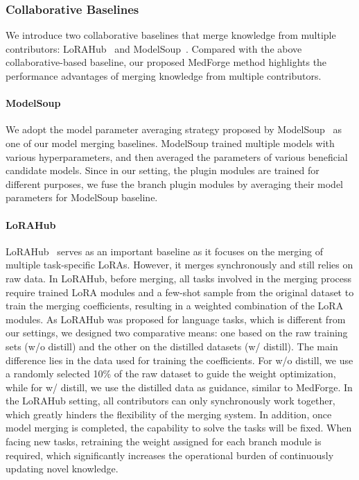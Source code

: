 \subsubsection{Collaborative Baselines}
We introduce two collaborative baselines that merge knowledge from multiple contributors: LoRAHub~\cite{huang2023lorahub} and ModelSoup~\cite{wortsman2022model}. Compared with the above collaborative-based baseline, our proposed MedForge method highlights the performance advantages of merging knowledge from multiple contributors.

\paragraph{ModelSoup}
We adopt the model parameter averaging strategy proposed by ModelSoup~\cite{wortsman2022model} as one of our model merging baselines.
ModelSoup trained multiple models with various hyperparameters, and then averaged the parameters of various beneficial candidate models. Since in our setting, the plugin modules are trained for different purposes, we fuse the branch plugin modules by averaging their model parameters for ModelSoup baseline.


\paragraph{LoRAHub}
LoRAHub~\cite{huang2023lorahub} serves as an important baseline as it focuses on the merging of multiple task-specific LoRAs. However, it merges synchronously and still relies on raw data. In LoRAHub, before merging, all tasks involved in the merging process require trained LoRA modules and a few-shot sample from the original dataset to train the merging coefficients, resulting in a weighted combination of the LoRA modules.
As LoRAHub was proposed for language tasks, which is different from our settings, we designed two comparative means: one based on the raw training sets (w/o distill) and the other on the distilled datasets (w/ distill). The main difference lies in the data used for training the coefficients. For w/o distill, we use a randomly selected 10\% of the raw dataset to guide the weight optimization, while for w/ distill, we use the distilled data as guidance, similar to MedForge.
In the LoRAHub setting, all contributors can only synchronously work together, which greatly hinders the flexibility of the merging system. In addition, once model merging is completed, the capability to solve the tasks will be fixed. When facing new tasks, retraining the weight assigned for each branch module is required, which significantly increases the operational burden of continuously updating novel knowledge.



